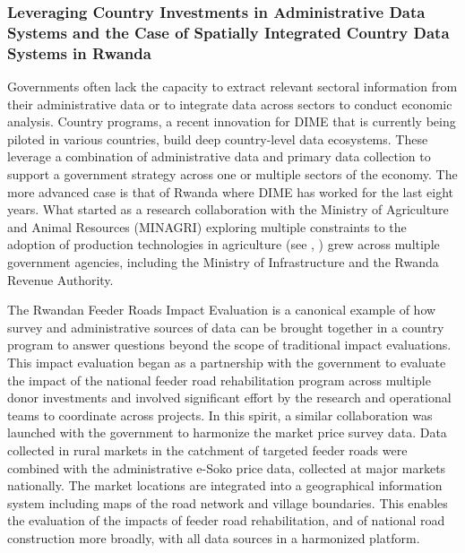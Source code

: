 \hypertarget{leveraging-country-investments-in-administrative-data-systems-and-the-case-of-spatially-integrated-country-data-systems-in-rwanda}{%
\subsubsection{Leveraging Country Investments in Administrative Data Systems and the Case of Spatially Integrated Country Data Systems in Rwanda}\label{leveraging-country-investments-in-administrative-data-systems-and-the-case-of-spatially-integrated-country-data-systems-in-rwanda}}

Governments often lack the capacity to extract relevant sectoral information from their administrative data or to integrate data across sectors to conduct economic analysis. Country programs, a recent innovation for DIME that is currently being piloted in various countries, build deep country-level data ecosystems. These leverage a combination of administrative data and primary data collection to support a government strategy across one or multiple sectors of the economy. The more advanced case is that of Rwanda where DIME has worked for the last eight years. What started as a research collaboration with the Ministry of Agriculture and Animal Resources (MINAGRI) exploring multiple constraints to the adoption of production technologies in agriculture (see \citet{jones2018}, \citet{jones2019}) grew across multiple government agencies, including the Ministry of Infrastructure and the Rwanda Revenue Authority.

The Rwandan Feeder Roads Impact Evaluation is a canonical example of how survey and administrative sources of data can be brought together in a country program to answer questions beyond the scope of traditional impact evaluations. This impact evaluation began as a partnership with the government to evaluate the impact of the national feeder road rehabilitation program across multiple donor investments and involved significant effort by the research and operational teams to coordinate across projects. In this spirit, a similar collaboration was launched with the government to harmonize the market price survey data. Data collected in rural markets in the catchment of targeted feeder roads were combined with the administrative e-Soko price data, collected at major markets nationally. The market locations are integrated into a geographical information system including maps of the road network and village boundaries. This enables the evaluation of the impacts of feeder road rehabilitation, and of national road construction more broadly, with all data sources in a harmonized platform.


